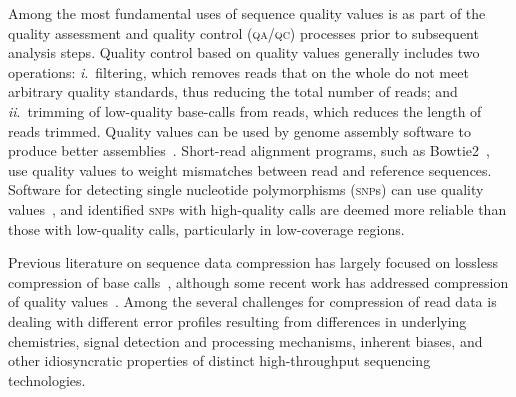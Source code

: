 \documentclass{bmcart}
\begin{document}
Among the most fundamental uses of sequence quality values is as part
of the quality assessment and quality control (\textsc{qa/qc})
processes prior to subsequent analysis steps. Quality control based on
quality values generally includes two operations:
\textit{i}.~filtering, which removes reads that on the whole do not
meet arbitrary quality standards, thus reducing the total number of
reads; and \textit{ii}.~trimming of low-quality base-calls from reads,
which reduces the length of reads trimmed. Quality values can be used
by genome assembly software to produce better
assemblies~\cite[e.g.,][]{Bryant:2009uq,Gnerre:2011kx}. Short-read
alignment programs, such as Bowtie2~\cite{Langmead:2012rw}, use
quality values to weight mismatches between read and reference
sequences. Software for detecting single nucleotide polymorphisms
(\textsc{snp}s) can use quality values~\cite[e.g.,][]{McKenna:2010bh},
and identified \textsc{snp}s with high-quality calls are deemed more
reliable than those with low-quality calls, particularly in
low-coverage regions.

Previous literature on sequence data compression has largely focused
on lossless compression of base calls~\cite[reviewed
  in][]{Deorowicz:2013hq, Giancarlo:2009fk,Giancarlo:2014rw,
  Nalbantoglu:2010uq,Zhu:2013qr}, although some recent work has
addressed compression of quality
values~\cite[e.g.,][]{Canovas:2014fr,Hach:2012ys,
  janin2013adaptive,Kozanitis:2011kl,Ochoa:2013rt,Tembe:2010ys,
  Wan:2012kq,DBLP:conf/recomb/YuYB14,zhou2014compression,Malysa01102015}.
Among the several challenges for compression of read data is dealing
with different error profiles resulting from differences in underlying
chemistries, signal detection and processing mechanisms, inherent
biases, and other idiosyncratic properties of distinct high-throughput
sequencing technologies.
\end{document}
